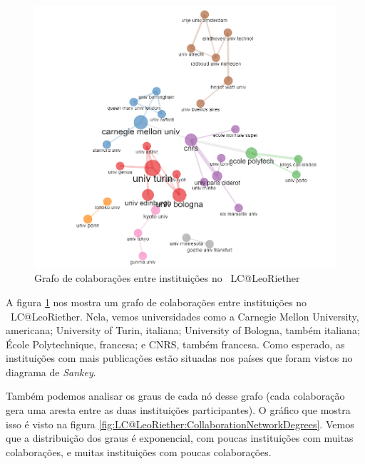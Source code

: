 \begin{figure}
    \centering
    \includegraphics[width=1\textwidth]{experiments/LeoRiether/AnaliseBibliometrica/LambdaCalculus/WoS-20220208/Images/CollaborationNetwork.png}
    \caption{Grafo de colaborações entre instituições no \dataset\  LC@LeoRiether}
    \label{fig:LC@LeoRiether:CollaborationNetwork}
\end{figure}

A figura \ref{fig:LC@LeoRiether:CollaborationNetwork} nos mostra um grafo de colaborações entre instituições no \dataset\  LC@LeoRiether. Nela, vemos universidades como a Carnegie Mellon University, americana; University of Turin, italiana; University of Bologna, também italiana; École Polytechnique, francesa; e CNRS, também francesa. Como esperado, as instituições com mais publicações estão situadas nos países que foram vistos no diagrama de \textit{Sankey}.

Também podemos analisar os graus de cada nó desse grafo (cada colaboração gera uma aresta entre as duas instituições participantes). O gráfico que mostra isso é visto na figura \ref{fig:LC@LeoRiether:CollaborationNetworkDegrees}. Vemos que a distribuição dos graus é exponencial, com poucas instituições com muitas colaborações, e muitas instituições com poucas colaborações.

